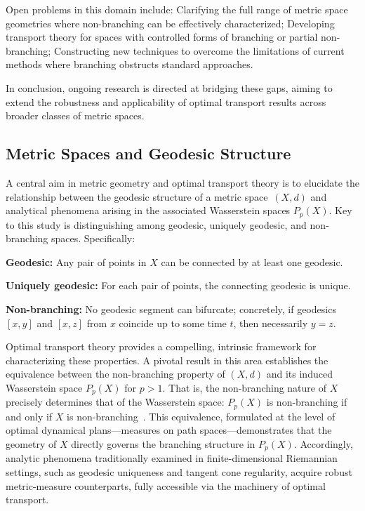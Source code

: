 \documentclass[sigconf]{acmart}
\begin{document}
Open problems in this domain include:
Clarifying the full range of metric space geometries where non-branching can be effectively characterized;
Developing transport theory for spaces with controlled forms of branching or partial non-branching;
Constructing new techniques to overcome the limitations of current methods where branching obstructs standard approaches.

In conclusion, ongoing research is directed at bridging these gaps, aiming to extend the robustness and applicability of optimal transport results across broader classes of metric spaces.

\subsection{Metric Spaces and Geodesic Structure}

A central aim in metric geometry and optimal transport theory is to elucidate the relationship between the geodesic structure of a metric space~$(X, d)$ and analytical phenomena arising in the associated Wasserstein spaces $P_p(X)$. Key to this study is distinguishing among geodesic, uniquely geodesic, and non-branching spaces. Specifically:

\textbf{Geodesic:} Any pair of points in $X$ can be connected by at least one geodesic.

\textbf{Uniquely geodesic:} For each pair of points, the connecting geodesic is unique.

\textbf{Non-branching:} No geodesic segment can bifurcate; concretely, if geodesics $[x, y]$ and $[x, z]$ from $x$ coincide up to some time $t$, then necessarily $y = z$.

Optimal transport theory provides a compelling, intrinsic framework for characterizing these properties. A pivotal result in this area establishes the equivalence between the non-branching property of $(X, d)$ and its induced Wasserstein space $P_p(X)$ for $p > 1$. That is, the non-branching nature of $X$ precisely determines that of the Wasserstein space: $P_p(X)$ is non-branching if and only if $X$ is non-branching~\cite{ref107}. This equivalence, formulated at the level of optimal dynamical plans—measures on path spaces—demonstrates that the geometry of $X$ directly governs the branching structure in $P_p(X)$. Accordingly, analytic phenomena traditionally examined in finite-dimensional Riemannian settings, such as geodesic uniqueness and tangent cone regularity, acquire robust metric-measure counterparts, fully accessible via the machinery of optimal transport.
\end{document}
